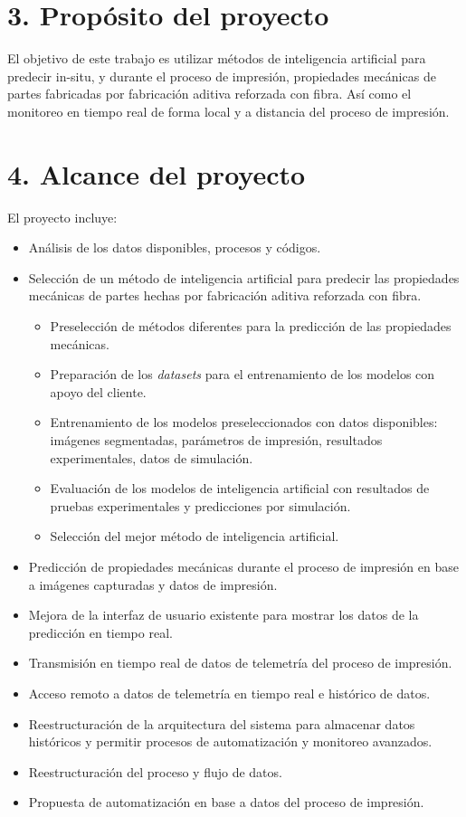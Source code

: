 \documentclass[
11pt, %
]{charter}
\begin{document}
\section{3. Propósito del proyecto}
\label{sec:proposito}

El objetivo de este trabajo es utilizar métodos de inteligencia artificial para predecir in-situ, y durante el proceso de impresión, propiedades mecánicas de partes fabricadas por fabricación aditiva reforzada con fibra. Así como el monitoreo en tiempo real de forma local y a distancia del proceso de impresión. 


\section{4. Alcance del proyecto}
\label{sec:alcance}

El proyecto incluye:
\begin{itemize}
	\item Análisis de los datos disponibles, procesos y códigos.
	\item Selección de un método de inteligencia artificial para predecir las propiedades mecánicas de partes hechas por fabricación aditiva reforzada con fibra.
		\begin{itemize}
		\item Preselección de métodos diferentes para la predicción de las propiedades mecánicas.
        \item Preparación de los \textit{datasets} para el entrenamiento de los modelos con apoyo del cliente.
		\item Entrenamiento de los modelos preseleccionados con datos disponibles: imágenes segmentadas, parámetros de impresión, resultados experimentales, datos de simulación.
		\item Evaluación de los modelos de inteligencia artificial con resultados de pruebas experimentales y predicciones por simulación.
        \item Selección del mejor método de inteligencia artificial.
		\end{itemize}
    \item Predicción de propiedades mecánicas durante el proceso de impresión en base a imágenes capturadas y datos de impresión.
	\item Mejora de la interfaz de usuario existente para mostrar los datos de la predicción en tiempo real.
    \item Transmisión en tiempo real de datos de telemetría del proceso de impresión.
    \item Acceso remoto a datos de telemetría en tiempo real e histórico de datos.
    \item Reestructuración de la arquitectura del sistema para almacenar datos históricos y permitir procesos de automatización y monitoreo avanzados.
    \item Reestructuración del proceso y flujo de datos.
    \item Propuesta de automatización en base a datos del proceso de impresión.
	
\end{itemize}
\end{document}
